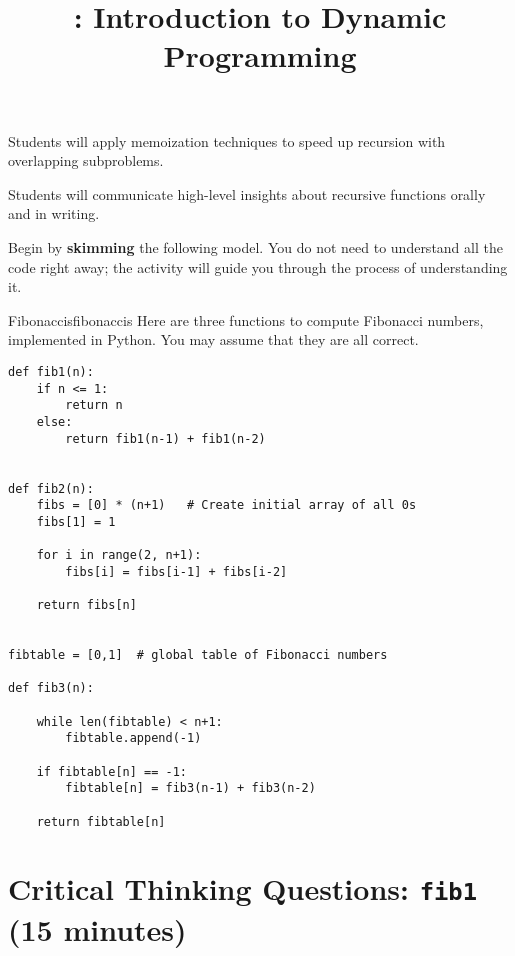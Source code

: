 \documentclass{tufte-handout}
\title{\thecourse: Introduction to Dynamic Programming}
\date{}
\begin{document}
\maketitle

\begin{objective}
  Students will apply memoization techniques to speed up recursion
  with overlapping subproblems.
\end{objective}

\begin{pobjective}
  Students will communicate high-level insights about recursive
  functions orally and in writing.
\end{pobjective}

Begin by \textbf{skimming} the following model.  You do not need to
understand all the code right away; the activity will guide you
through the process of understanding it.

\begin{model}{Fibonaccis}{fibonaccis}
Here are three functions to compute Fibonacci numbers, implemented in
Python.  You may assume that they are all correct.

\begin{verbatim}
def fib1(n):
    if n <= 1:
        return n
    else:
        return fib1(n-1) + fib1(n-2)


def fib2(n):
    fibs = [0] * (n+1)   # Create initial array of all 0s
    fibs[1] = 1

    for i in range(2, n+1):
        fibs[i] = fibs[i-1] + fibs[i-2]

    return fibs[n]


fibtable = [0,1]  # global table of Fibonacci numbers

def fib3(n):

    while len(fibtable) < n+1:
        fibtable.append(-1)

    if fibtable[n] == -1:
        fibtable[n] = fib3(n-1) + fib3(n-2)

    return fibtable[n]
\end{verbatim}
\end{model}

\section{Critical Thinking Questions: \texttt{fib1} (15 minutes)}
\end{document}
